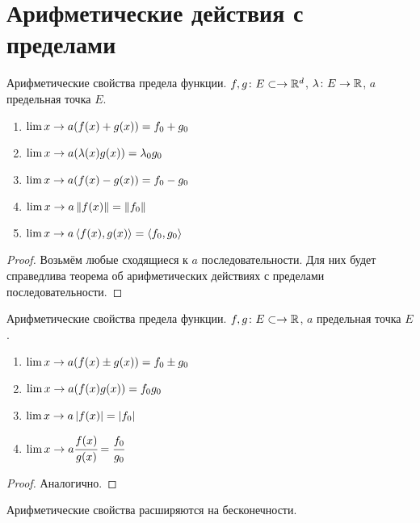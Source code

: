 \section{Арифметические действия с пределами}


\begin{theorem}{Арифметические свойства предела функции.}
$f, g\colon E \subset \rightarrow \mathbb{R}^d$, $\lambda\colon E \rightarrow \mathbb{R}$, $a$ предельная точка $E$.
\begin{enumerate}
\item $\lim\limits{x\rightarrow a} (f(x) + g(x)) = f_0 + g_0$
\item $\lim\limits{x\rightarrow a} (\lambda(x)  g(x)) = \lambda_0 g_0$
\item $\lim\limits{x\rightarrow a} (f(x) - g(x)) = f_0 - g_0$
\item $\lim\limits{x\rightarrow a} \left\|f(x)\right\| = \left\|f_0\right\|$
\item $\lim\limits{x\rightarrow a} \left<f(x), g(x)\right> = \left<f_0, g_0\right>$
\end{enumerate}
\end{theorem}
\begin{proof}
Возьмём любые сходящиеся к $a$ последовательности. Для них будет справедлива теорема об арифметических действиях с пределами последовательности.
\end{proof}

\begin{theorem}{Арифметические свойства предела функции.}
$f, g\colon E \subset \rightarrow \mathbb{R}$, $a$ предельная точка $E$.
\begin{enumerate}
\item $\lim\limits{x\rightarrow a} (f(x) \pm g(x)) = f_0 \pm g_0$
\item $\lim\limits{x\rightarrow a} (f(x) g(x)) = f_0 g_0$
\item $\lim\limits{x\rightarrow a} \left|f(x)\right| = \left|f_0\right|$
\item $\lim\limits{x\rightarrow a} \cfrac{f(x)}{g(x)}=\cfrac{f_0}{g_0}$
\end{enumerate}
\end{theorem}
\begin{proof}
Аналогично.
\end{proof}

\begin{Rem}
Арифметические свойства расширяются на бесконечности.
\end{Rem}